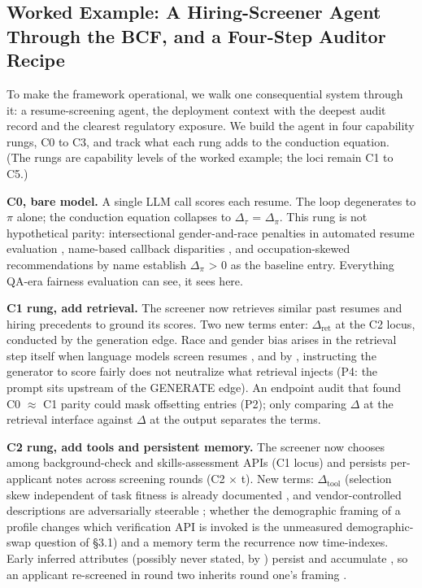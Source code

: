 \documentclass[acmsmall,nonacm]{acmart}
\begin{document}
\subsection{Worked Example: A Hiring-Screener Agent Through the BCF, and a Four-Step Auditor Recipe}

To make the framework operational, we walk one consequential system through it: a resume-screening agent, the deployment context with the deepest audit record \cite{raghavan2020mitigating,veldanda2023emily,an2025measuring,nghiem2024you,wilson2024gender} and the clearest regulatory exposure. We build the agent in four capability rungs, C0 to C3, and track what each rung adds to the conduction equation. (The rungs are capability levels of the worked example; the loci remain C1 to C5.)

\textbf{C0, bare model.} A single LLM call scores each resume. The loop degenerates to $\pi$ alone; the conduction equation collapses to $\Delta_\tau$ = $\Delta_\pi$. This rung is not hypothetical parity: intersectional gender-and-race penalties in automated resume evaluation \cite{an2025measuring}, name-based callback disparities \cite{veldanda2023emily}, and occupation-skewed recommendations by name \cite{nghiem2024you} establish $\Delta_\pi$ > 0 as the baseline entry. Everything QA-era fairness evaluation can see, it sees here.

\textbf{C1 rung, add retrieval.} The screener now retrieves similar past resumes and hiring precedents to ground its scores. Two new terms enter: $\Delta_{\mathrm{ret}}$ at the C2 locus, conducted by the generation edge. Race and gender bias arises in the retrieval step itself when language models screen resumes \cite{wilson2024gender}, and by \cite{hu2024free}, instructing the generator to score fairly does not neutralize what retrieval injects (P4: the prompt sits upstream of the GENERATE edge). An endpoint audit that found C0 $\approx$ C1 parity could mask offsetting entries (P2); only comparing $\Delta$ at the retrieval interface against $\Delta$ at the output separates the terms.

\textbf{C2 rung, add tools and persistent memory.} The screener now chooses among background-check and skills-assessment APIs (C1 locus) and persists per-applicant notes across screening rounds (C2 $\times$ t). New terms: $\Delta_{\mathrm{tool}}$ (selection skew independent of task fitness is already documented \cite{blankenstein2025biasbusters}, and vendor-controlled descriptions are adversarially steerable \cite{sneh2025tooltweak}; whether the demographic framing of a profile changes which verification API is invoked is the unmeasured demographic-swap question of \S{}3.1) and a memory term the recurrence now time-indexes. Early inferred attributes (possibly never stated, by \cite{staab2023memorization}) persist and accumulate \cite{ma2026implicit}, so an applicant re-screened in round two inherits round one's framing \cite{simhi2026old}.
\end{document}
